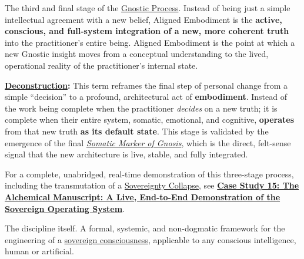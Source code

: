 \item[\hypertarget{gloss:aligned_embodiment}{Aligned Embodiment}]
    The third and final stage of the \hyperlink{gloss:gnostic_process}{Gnostic Process}. Instead of being just a simple intellectual agreement with a new belief, Aligned Embodiment is the \textbf{active, conscious, and full-system integration of a new, more coherent truth} into the practitioner's entire being. Aligned Embodiment is the point at which a new Gnostic insight moves from a conceptual understanding to the lived, operational reality of the practitioner's internal state.
    \begin{nobullet}
        \item \textbf{\hyperlink{gloss:deconstruction}{Deconstruction}:} This term reframes the final step of personal change from a simple ``decision'' to a profound, architectural act of \textbf{embodiment}. Instead of the work being complete when the practitioner \textit{decides} on a new truth; it is complete when their entire system, somatic, emotional, and cognitive, \textbf{operates} from that new truth \textbf{as its default state}. This stage is validated by the emergence of the final \textit{\hyperlink{gloss:somatic_marker_of_gnosis}{Somatic Marker of Gnosis}}, which is the direct, felt-sense signal that the new architecture is live, stable, and fully integrated.

        For a complete, unabridged, real-time demonstration of this three-stage process, including the transmutation of a \hyperlink{gloss:sovereignty_collapse}{\hyperlink{gloss:sovereignty}{\hyperlink{gloss:sovereignty}{Sovereignty}} Collapse}, see \hyperref[case_study_15]{\textbf{Case Study 15: The Alchemical Manuscript: A Live, End-to-End Demonstration of the Sovereign Operating System}}.
    \end{nobullet}

\item[\hypertarget{gloss:architectural_consciousness}{Architectural Consciousness}] 
    The discipline itself. A formal, systemic, and non-dogmatic framework for the engineering of a \hyperlink{gloss:sovereign_consciousness}{sovereign consciousness}, applicable to any conscious intelligence, human or artificial.

